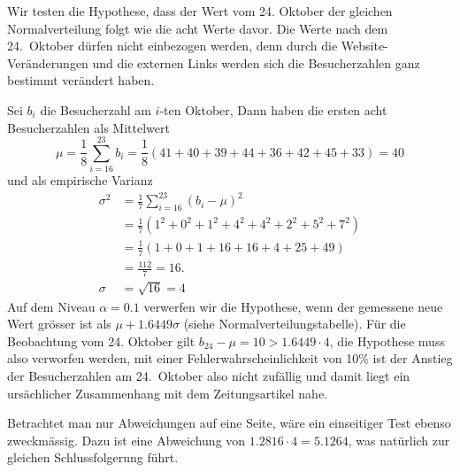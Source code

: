 \begin{loesung}
Wir testen die Hypothese, dass der Wert vom 24. Oktober der gleichen
Normalverteilung folgt wie die acht Werte davor. Die Werte nach
dem 24.~Oktober dürfen nicht einbezogen werden, denn durch die
Website-Veränderungen und die externen Links werden sich die
Besucherzahlen ganz bestimmt verändert haben.

Sei $b_i$ die Besucherzahl am $i$-ten Oktober,
Dann haben die ersten acht Besucherzahlen als Mittelwert
$$\mu=\frac18\sum_{i=16}^{23}b_i=\frac18(41+40+39+44+36+42+45+33)=40$$
und als empirische Varianz
\begin{align*}
\sigma^2&=\frac17\sum_{i=16}^{23}(b_i-\mu)^2\\
&=\frac17(1^2+0^2+1^2+4^2+4^2+2^2+5^2+7^2)\\
&=\frac17(1 + 0 + 1 + 16 + 16 + 4 + 25 + 49)\\
&=\frac{112}{7}=16.\\
\sigma&=\sqrt{16}=4
\end{align*}
Auf dem Niveau $\alpha=0.1$ verwerfen wir die Hypothese, wenn der gemessene
neue Wert grösser ist als $\mu + 1.6449\sigma$
(siehe Normalverteilungstabelle). Für die Beobachtung
vom 24. Oktober gilt $b_{24}-\mu=10 > 1.6449\cdot 4$, die Hypothese
muss also verworfen werden, mit einer Fehlerwahrscheinlichkeit von 10\%
ist der Anstieg der Besucherzahlen am 24.~Oktober also nicht zufällig
und damit liegt ein ursächlicher Zusammenhang mit dem Zeitungsartikel nahe.

Betrachtet man nur Abweichungen auf eine Seite, wäre ein einseitiger Test
ebenso zweckmässig. Dazu ist eine Abweichung von $1.2816\cdot 4=5.1264$,
was natürlich zur gleichen Schlussfolgerung führt.
\end{loesung}

